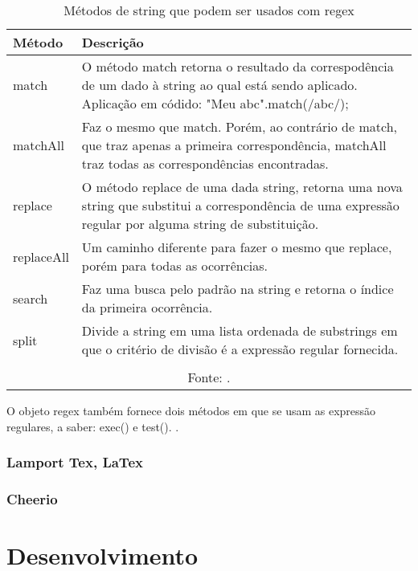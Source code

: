 \begin{table}[H]
    \centering
    \caption{Métodos de string que podem ser usados com regex}
    \label{tbl:string-methods-regex}
    \renewcommand{\arraystretch}{1.5}
    \begin{tabular}{p{2.4cm} p{13.6cm}}
        \hline
        \textbf{Método} & \textbf{Descrição} \\
        \hline
        match & O método match retorna o resultado da correspodência de um dado
            \cite{mdn-regex}
            à string ao qual está sendo aplicado. Aplicação em códido:
            "Meu abc".match(/abc/);
         \\
		matchAll & Faz o mesmo que match. Porém, ao contrário de match, que traz apenas
            a primeira correspondência, matchAll traz todas as correspondências
            encontradas.
         \\
		replace & O método replace de uma dada string, retorna uma nova string que substitui
            a correspondência de uma expressão regular por alguma string de substituição.
         \\
		replaceAll & Um caminho diferente para fazer o mesmo que replace, porém para todas
            as ocorrências.
         \\
		search & Faz uma busca pelo padrão na string e retorna o índice da primeira ocorrência. \\
		split & Divide a string em uma lista ordenada de substrings em que o critério de divisão é a expressão regular fornecida. \\
        \hline
        \\\multicolumn{2}{c}{\fontsize{10pt}{12pt}Fonte: \cite{mdn-regex}.}
    \end{tabular}
\end{table}

O objeto
\acrshort{regex}
também fornece dois métodos em que se usam as expressão regulares,
a saber: exec() e test().
\cite{mdn-regex}.

\subsection{Lamport Tex, LaTex}

\subsection{Cheerio}

\chapter{Desenvolvimento}

